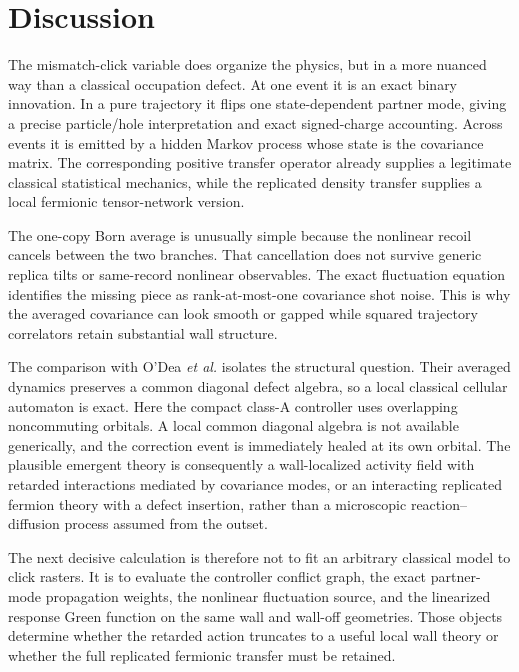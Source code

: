 \documentclass[
  aps,prx,twocolumn,superscriptaddress,longbibliography,
  nofootinbib,floatfix
]{revtex4-2}
\theoremstyle{plain}
\theoremstyle{definition}
\begin{document}
\section{Discussion}
\label{sec:discussion}

The mismatch-click variable does organize the physics, but in a more nuanced
way than a classical occupation defect.  At one event it is an exact binary
innovation.  In a pure trajectory it flips one state-dependent partner mode,
giving a precise particle/hole interpretation and exact signed-charge
accounting.  Across events it is emitted by a hidden Markov process whose state
is the covariance matrix.  The corresponding positive transfer operator
already supplies a legitimate classical statistical mechanics, while the
replicated density transfer supplies a local fermionic tensor-network version.

The one-copy Born average is unusually simple because the nonlinear recoil
cancels between the two branches.  That cancellation does not survive generic
replica tilts or same-record nonlinear observables.  The exact fluctuation
equation identifies the missing piece as rank-at-most-one covariance shot
noise.  This
is why the averaged covariance can look smooth or gapped while squared
trajectory correlators retain substantial wall structure.

The comparison with O'Dea \emph{et al.} isolates the structural question.
Their averaged dynamics preserves a common diagonal defect algebra, so a local
classical cellular automaton is exact.  Here the compact class-A controller
uses overlapping noncommuting orbitals.  A local common diagonal algebra is not
available generically, and the correction event is immediately healed at its
own orbital.  The plausible emergent theory is consequently a wall-localized
activity field with retarded interactions mediated by covariance modes, or an
interacting replicated fermion theory with a defect insertion, rather than a
microscopic reaction--diffusion process assumed from the outset.

The next decisive calculation is therefore not to fit an arbitrary classical
model to click rasters.  It is to evaluate the controller conflict graph, the
exact partner-mode propagation weights, the nonlinear fluctuation source, and
the linearized response Green function on the same wall and wall-off
geometries.  Those
objects determine whether the retarded action truncates to a useful local wall
theory or whether the full replicated fermionic transfer must be retained.
\end{document}
